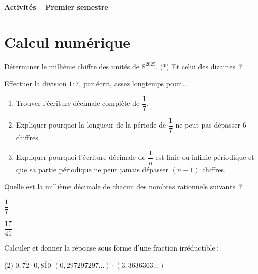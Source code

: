 \documentclass[a4paper,12pt]{article}
\begin{document}
\setlength{\cftbeforesecskip}{2pt}

\setlength{\cftsecindent}{1em}
\begin{center}
{\bfseries \Huge Activités -- Premier semestre}
\vspace{1cm}


\end{center}\vspace{-1cm}
\tableofcontents
\newpage
\clearpage
\setcounter{page}{1}
\section{Calcul numérique}
\begin{activite}
	\tcblower
	Déterminer le millième chiffre des unités de $8^{2025}$. 
	(*) Et celui des dizaines~?
\end{activite}
\begin{activite}
	\tcblower
	Effectuer la division $1:7$, par écrit, assez longtemps pour...
\begin{enumerate}
\item Trouver l'écriture décimale complète de $\dfrac{1}{7}$.
\item Expliquer pourquoi la longueur de la période de $\dfrac{1}{7}$ ne peut pas dépasser 6 chiffres.
\item Expliquer pourquoi l'écriture décimale de $\dfrac{1}{n}$ est finie ou infinie périodique et que sa partie périodique ne peut jamais dépasser $(n-1)$ chiffres.
\end{enumerate}
\end{activite}
\begin{activite}
	\tcblower
Quelle est la millième décimale de chacun des nombres rationnels suivants~?
\begin{inlineumerate}
\item $\dfrac{1}{7}$
\item $\dfrac{17}{41}$
\end{inlineumerate}
\end{activite}

\begin{activite}
	\tcblower
Calculer et donner la réponse sous forme d'une fraction irréductible\,:
\begin{tasks}(2)
\task $0, \overline{72} \cdot 0, \overline{810}$
\task $(0,297297297 \ldots) \cdot(3,3636363 \ldots)$
\end{tasks}
\end{activite}
\end{document}
